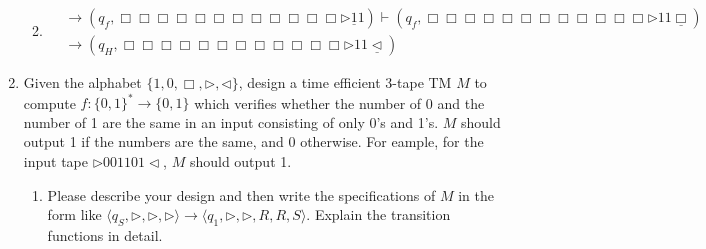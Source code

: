 \documentclass[12pt,a4paper]{article}
\makeatletter
\newtheorem*{solution}{Solution}
\theoremstyle{definition}
\renewenvironment{solution}[1][Solution] {\par\pushQED{\qed}\normalfont\topsep6\p@\@plus6\p@\relax\trivlist\item[\hskip\labelsep\bfseries#1\@addpunct{.}]\ignorespaces}{\popQED\endtrivlist\@endpefalse} \makeatother
\makeatother
\begin{document}
\begin{enumerate}
\begin{enumerate}
\begin{solution}
\begin{align*}
			&\rightarrow (q_f,\Box  \Box  \Box  \Box  \Box  \Box  \Box  \Box  \Box \Box  \Box  \Box \triangleright \underline{1} 1) \vdash (q_f,\Box  \Box  \Box  \Box  \Box  \Box  \Box  \Box  \Box \Box  \Box  \Box \triangleright 1 1 \underline{\Box})\\
			&\rightarrow  (q_H,\Box  \Box  \Box  \Box  \Box  \Box  \Box  \Box  \Box \Box  \Box  \Box \triangleright 1 1 \underline{\triangleleft})
		\end{align*}
	\end{solution}
	
\end{enumerate}

	\item 
	Given the alphabet $\{1, 0, \Box, \triangleright, \triangleleft\}$, design a time efficient 3-tape TM $M$ to compute $f:\{0,1\}^*\rightarrow\{0,1\}$ which verifies whether the number of 0 and the number of 1 are the same in an input consisting of only 0's and 1's. $M$ should output 1 if the numbers are the same, and 0 otherwise. For eample, for the input tape $\triangleright 001101\triangleleft$, $M$ should output 1.

	\begin{enumerate}
	\item
	Please describe your design and then write the specifications of $M$ in the form like $\langle q_S, \triangleright, \triangleright, \triangleright \rangle \rightarrow \langle q_1, \triangleright,\triangleright,  R, R, S \rangle$. Explain the transition functions in detail.


\end{enumerate}
\end{enumerate}
\end{document}
